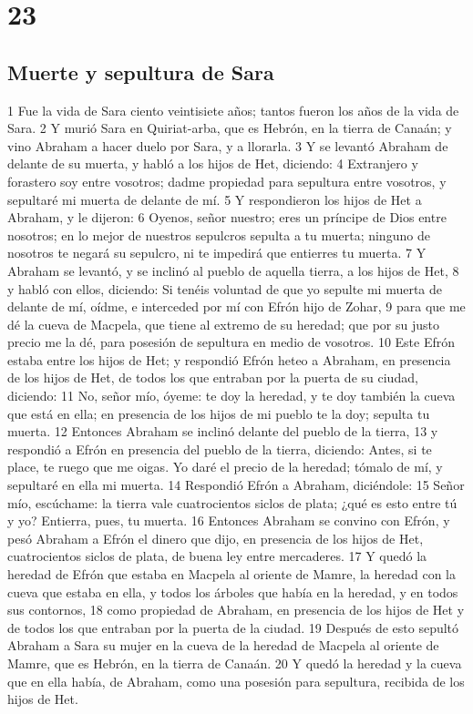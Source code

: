 \chapter{23}

\section{Muerte y sepultura de Sara}

1 Fue la vida de Sara ciento veintisiete años; tantos fueron los años de la vida de Sara.
2 Y murió Sara en Quiriat-arba, que es Hebrón, en la tierra de Canaán; y vino Abraham a hacer duelo por Sara, y a llorarla.
3 Y se levantó Abraham de delante de su muerta, y habló a los hijos de Het, diciendo:
4 Extranjero y forastero soy entre vosotros; dadme propiedad para sepultura entre vosotros, y sepultaré mi muerta de delante de mí.
5 Y respondieron los hijos de Het a Abraham, y le dijeron:
6 Oyenos, señor nuestro; eres un príncipe de Dios entre nosotros; en lo mejor de nuestros sepulcros sepulta a tu muerta; ninguno de nosotros te negará su sepulcro, ni te impedirá que entierres tu muerta.
7 Y Abraham se levantó, y se inclinó al pueblo de aquella tierra, a los hijos de Het,
8 y habló con ellos, diciendo: Si tenéis voluntad de que yo sepulte mi muerta de delante de mí, oídme, e interceded por mí con Efrón hijo de Zohar,
9 para que me dé la cueva de Macpela, que tiene al extremo de su heredad; que por su justo precio me la dé, para posesión de sepultura en medio de vosotros.
10 Este Efrón estaba entre los hijos de Het; y respondió Efrón heteo a Abraham, en presencia de los hijos de Het, de todos los que entraban por la puerta de su ciudad, diciendo:
11 No, señor mío, óyeme: te doy la heredad, y te doy también la cueva que está en ella; en presencia de los hijos de mi pueblo te la doy; sepulta tu muerta.
12 Entonces Abraham se inclinó delante del pueblo de la tierra,
13 y respondió a Efrón en presencia del pueblo de la tierra, diciendo: Antes, si te place, te ruego que me oigas. Yo daré el precio de la heredad; tómalo de mí, y sepultaré en ella mi muerta.
14 Respondió Efrón a Abraham, diciéndole:
15 Señor mío, escúchame: la tierra vale cuatrocientos siclos de plata; ¿qué es esto entre tú y yo? Entierra, pues, tu muerta.
16 Entonces Abraham se convino con Efrón, y pesó Abraham a Efrón el dinero que dijo, en presencia de los hijos de Het, cuatrocientos siclos de plata, de buena ley entre mercaderes.
17 Y quedó la heredad de Efrón que estaba en Macpela al oriente de Mamre, la heredad con la cueva que estaba en ella, y todos los árboles que había en la heredad, y en todos sus contornos,
18 como propiedad de Abraham, en presencia de los hijos de Het y de todos los que entraban por la puerta de la ciudad.
19 Después de esto sepultó Abraham a Sara su mujer en la cueva de la heredad de Macpela al oriente de Mamre, que es Hebrón, en la tierra de Canaán.
20 Y quedó la heredad y la cueva que en ella había, de Abraham, como una posesión para sepultura, recibida de los hijos de Het.

